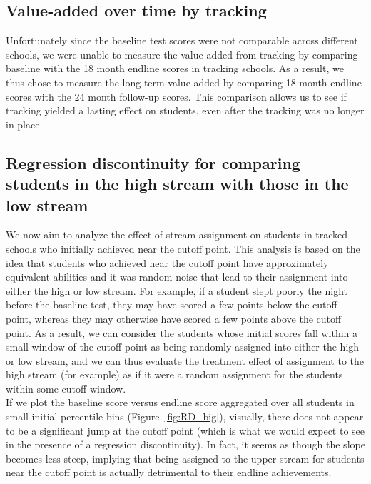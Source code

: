 \documentclass[11pt]{article}
\begin{document}
 \subsection{Value-added over time by tracking}
 
Unfortunately since the baseline test scores were not comparable across different schools, we were unable to measure the value-added from tracking by comparing baseline with the 18 month endline scores in tracking schools. As a result, we thus chose to measure the long-term value-added by comparing 18 month endline scores with the 24 month follow-up scores. This comparison allows us to see if tracking yielded a lasting effect on students, even after the tracking was no longer in place.


 \subsection{Regression discontinuity for comparing students in the high stream with those in the low stream}
We now aim to analyze the effect of stream assignment on students in tracked schools who initially achieved near the cutoff point. This analysis is based on the idea that students who achieved near the cutoff point have approximately equivalent abilities and it was random noise that lead to their assignment into either the high or low stream. For example, if a student slept poorly the night before the baseline test, they may have scored a few points below the cutoff point, whereas they may otherwise have scored a few points above the cutoff point. As a result, we can consider the students whose initial scores fall within a small window of the cutoff point as being randomly assigned into either the high or low stream, and we can thus evaluate the treatment effect of assignment to the high stream (for example) as if it were a random assignment for the students within some cutoff window.\\
If we plot the baseline score versus endline score aggregated over all students in small initial percentile bins (Figure~\ref{fig:RD_big}), visually, there does not appear to be a significant jump at the cutoff point (which is what we would expect to see in the presence of a regression discontinuity). In fact, it seems as though the slope becomes less steep, implying that being assigned to the upper stream for students near the cutoff point is actually detrimental to their endline achievements.
\end{document}
